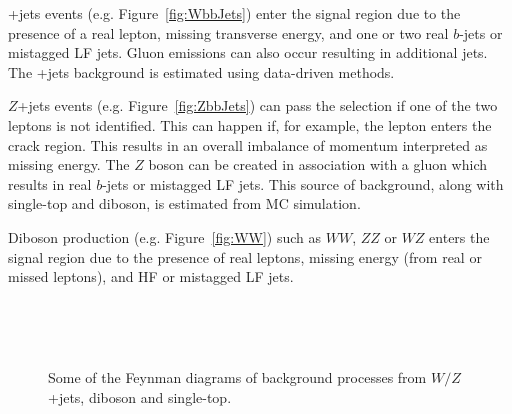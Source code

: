 \W+jets events (e.g. Figure~\ref{fig:WbbJets}) enter the signal region due to the presence of a real lepton, missing transverse energy, and one or two real $b$-jets or mistagged LF jets. Gluon emissions can also occur resulting in additional jets. The \W+jets background is estimated using data-driven methods.

$Z$+jets events (e.g. Figure~\ref{fig:ZbbJets}) can pass the selection if one of the two leptons is not identified. This can happen if, for example, the lepton enters the crack region. This results in an overall imbalance of momentum interpreted as missing energy. The $Z$ boson can be created in association with a gluon which results in real $b$-jets or mistagged LF jets. This source of background, along with single-top and diboson, is estimated from MC simulation.

Diboson production (e.g. Figure~\ref{fig:WW}) such as $WW$, $ZZ$ or $WZ$ enters the signal region due to the presence of real leptons, missing energy (from real or missed leptons), and HF or mistagged LF jets.

\begin{figure}[htbp]
  \centering
    \begin{minipage}[][][t]{.45\textwidth}
      \centering
        
        \label{fig:WbbJets}
    \end{minipage}
    \,
    \begin{minipage}[][][t]{.45\textwidth}
      \centering
        
        \label{fig:ZbbJets}
    \end{minipage}
    
    \begin{minipage}[][][t]{.45\textwidth}
      \centering
        
        \label{fig:WW}
    \end{minipage}
    \,
    \begin{minipage}[][][t]{.45\textwidth}
      \centering
        
        \label{fig:SingleTop}
    \end{minipage}
    \caption{Some of the Feynman diagrams of background processes from $W/Z$+jets, diboson and single-top.}\label{fig:CrossSectionWJetsFeynman}
\end{figure}

